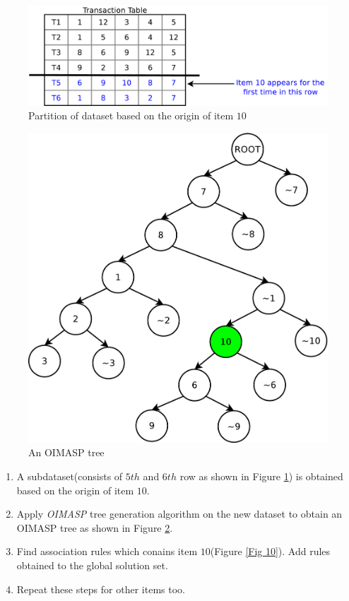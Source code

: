 \documentclass[3p, twocolumn]{elsarticle}
\begin{document}
\begin{figure}
\begin{center}
\includegraphics[scale=0.35]{pdf/partition}
\end{center}
\caption{Partition of dataset based on the origin of item $ 10 $}
\label{Fig 8}
\end{figure}

\begin{figure}
\begin{center}
\includegraphics[scale=0.25]{pdf/moimasp}
\end{center}
\caption{An OIMASP tree}
\label{Fig 9}
\end{figure}

\begin{enumerate}[Step 1.]
\item A subdataset(consists of $ 5th $ and $ 6th $ row as shown in Figure \ref{Fig 8}) is obtained based on the origin of item $ 10 $.
\item Apply \emph{OIMASP} tree generation algorithm on the new dataset to obtain an OIMASP tree as shown in Figure \ref{Fig 9}.
\item Find association rules which conains item $ 10 $(Figure \ref{Fig 10}). Add rules obtained to the global solution set.
\item Repeat these steps for other items too.
\end{enumerate}
\end{document}
